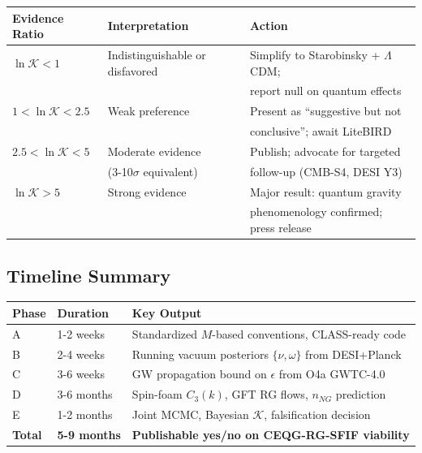 \documentclass[12pt,a4paper]{article}
\begin{document}
\begin{center}
\begin{tabular}{|l|l|l|}
\hline
\textbf{Evidence Ratio} & \textbf{Interpretation} & \textbf{Action} \\
\hline
\(\ln \mathcal{K} < 1\) & Indistinguishable or disfavored & Simplify to Starobinsky + \(\Lambda\)CDM; \\
 & & report null on quantum effects \\
\hline
\(1 < \ln \mathcal{K} < 2.5\) & Weak preference & Present as ``suggestive but not \\
 & & conclusive''; await LiteBIRD \\
\hline
\(2.5 < \ln \mathcal{K} < 5\) & Moderate evidence & Publish; advocate for targeted \\
 & (3-10\(\sigma\) equivalent) & follow-up (CMB-S4, DESI Y3) \\
\hline
\(\ln \mathcal{K} > 5\) & Strong evidence & Major result: quantum gravity \\
 & & phenomenology confirmed; press release \\
\hline
\end{tabular}
\end{center}

\subsection{Timeline Summary}

\begin{center}
\begin{tabular}{|l|l|l|}
\hline
\textbf{Phase} & \textbf{Duration} & \textbf{Key Output} \\
\hline
A & 1-2 weeks & Standardized \(M\)-based conventions, CLASS-ready code \\
B & 2-4 weeks & Running vacuum posteriors \(\{\nu, \omega\}\) from DESI+Planck \\
C & 3-6 weeks & GW propagation bound on \(\epsilon\) from O4a GWTC-4.0 \\
D & 3-6 months & Spin-foam \(C_3(k)\), GFT RG flows, \(n_{NG}\) prediction \\
E & 1-2 months & Joint MCMC, Bayesian \(\mathcal{K}\), falsification decision \\
\hline
\textbf{Total} & \textbf{5-9 months} & \textbf{Publishable yes/no on CEQG-RG-SFIF viability} \\
\hline
\end{tabular}
\end{center}
\end{document}
